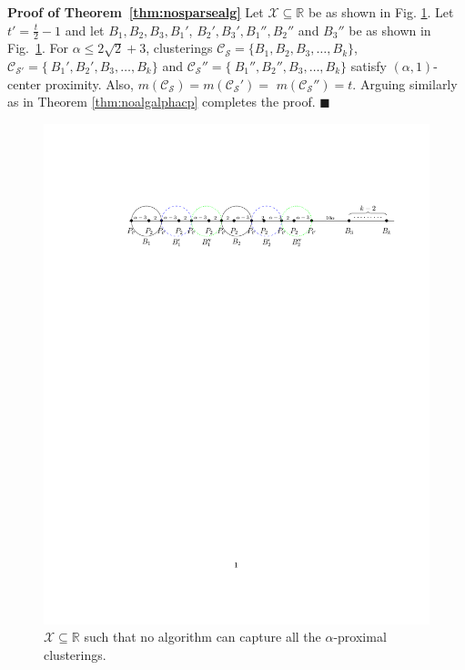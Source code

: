 \documentclass[orivec]{llncs}
\newcommand{\mc}{\mathcal}
\renewcommand{\qed}{\hfill\ensuremath{\blacksquare}}
\begin{document}
\noindent\textbf{Proof of Theorem~\ref{thm:nosparsealg}}
Let $\mc X \subseteq \mathbb{R}$ be as shown in Fig. \ref{fig:nosparsealg}. Let $t' = \frac{t}{2}-1$ and let $B_1, B_2, B_3, B_1'$, $B_2', B_3', B_1'', B_2''$ and $B_3''$ be as shown in Fig.~\ref{fig:nosparsealg}. For $\alpha \le 2\sqrt{2}+3$, clusterings $\mc C_{\mc S} = \{B_1, B_2, B_3, \ldots, B_k\}$, $\mc C_{\mc S'} = \{\ B_1', B_2', B_3, \ldots, B_k\}$ and $\mc C_{\mc S}'' = \{\ B_1'', B_2'', B_3, \ldots, B_k\}$ satisfy $(\alpha, 1)$-center proximity. Also, $m(\mc C_{\mc S}) = m(\mc C_{\mc S}') =$ $m(\mc C_{\mc S}'') = t$. Arguing similarly as in Theorem \ref{thm:noalgalphacp} completes the proof. \qed\\
\begin{figure}[!t]
\vspace{-5mm}
\begin{center}
\includegraphics[trim={45mm 210mm 20mm 43mm},clip,width=\textwidth]{lbdFig3.pdf}
\end{center}
\vspace{-4mm}
\caption{$\mc X \subseteq \mathbb{R}$ such that no algorithm can capture all the $\alpha$-proximal clusterings. } 
\label{fig:nosparsealg}
\end{figure}
\end{document}

